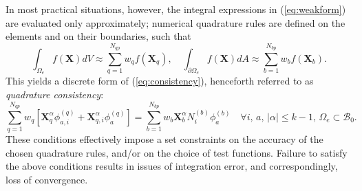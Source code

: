 In most practical situations, however, the integral expressions in (\ref{eq:weakform}) are evaluated only approximately; numerical quadrature rules are defined on the elements and on their boundaries, such that
\begin{equation}
  \int_{\Omega_e} f(\mathbf{X}) dV \approx \sum_{q=1}^{N_{qp}} w_q f(\mathbf{X}_q), \quad \int_{\partial \Omega_e} f(\mathbf{X}) dA \approx \sum_{b=1}^{N_{bp}} w_b f(\mathbf{X}_b).
\end{equation}
This yields a discrete form of (\ref{eq:consistency}), henceforth referred to as \textit{quadrature consistency}:
\begin{equation}
  \sum_{q=1}^{N_{qp}} w_q \left[ \mathbf{X}_q^{\alpha} \phi^{(q)}_{a,i} + \mathbf{X}^{\alpha}_{q,i} \phi^{(q)}_a \right] = \sum_{b=1}^{N_{bp}} w_b \mathbf{X}_b^{\alpha} N^{(b)}_i \phi^{(b)}_a \quad \forall i, \, a, \, | \alpha | \leq k-1, \, \Omega_e \subset \mathcal{B}_0.
  \label{eq:quadrature_consistency}
\end{equation}
These conditions effectively impose a set constraints on the accuracy of the chosen quadrature rules, and/or on the choice of test functions. Failure to satisfy the above conditions results in issues of integration error, and correspondingly, loss of convergence.